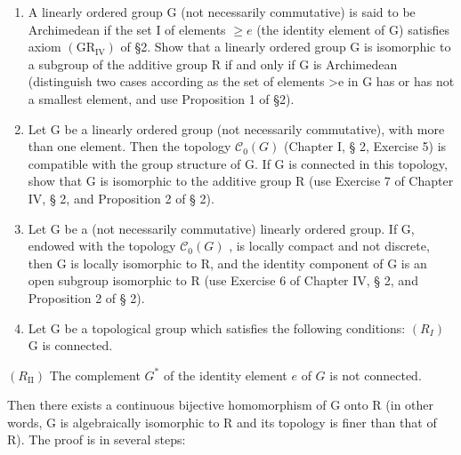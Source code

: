 \ExerciseSection

\begin{enumerate}
\def\labelenumi{\arabic{enumi})}
\item
  A linearly ordered group G (not necessarily commutative) is said to be Archimedean if the set I of elements \(\geqslant e\) (the identity element of G) satisfies axiom \((\mathrm{GR}_{\mathrm{IV}})\) of §2. Show that a linearly ordered group G is isomorphic to a subgroup of the additive group R if and only if G is Archimedean (distinguish two cases according as the set of elements \textgreater e in G has or has not a smallest element, and use Proposition 1 of §2).
\item
  Let G be a linearly ordered group (not necessarily commutative), with more than one element. Then the topology \(\mathcal{C}_{0}(G)\) (Chapter I, § 2, Exercise 5) is compatible with the group structure of G. If G is connected in this topology, show that G is isomorphic to the additive group R (use Exercise 7 of Chapter IV, § 2, and Proposition 2 of § 2).
\item
  Let G be a (not necessarily commutative) linearly ordered group. If G, endowed with the topology \(\mathcal{C}_{0}(G)\) , is locally compact and not discrete, then G is locally isomorphic to R, and the identity component of G is an open subgroup isomorphic to R (use Exercise 6 of Chapter IV, § 2, and Proposition 2 of § 2).
\item
  Let G be a topological group which satisfies the following conditions: \((R_{I})\) G is connected.
\end{enumerate}

\((R_{\mathrm{II}})\) The complement \(G^{*}\) of the identity element \(e\) of \(G\) is not connected.

Then there exists a continuous bijective homomorphism of G onto R (in other words, G is algebraically isomorphic to R and its topology is finer than that of R). The proof is in several steps:

